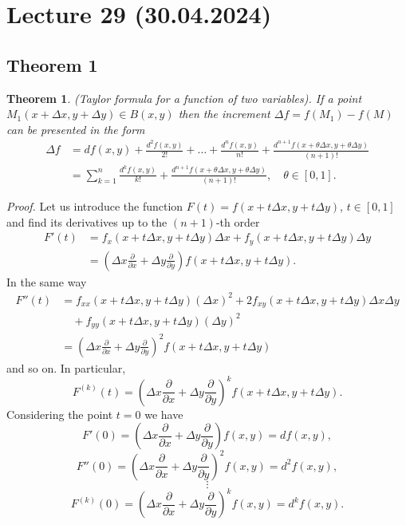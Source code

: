 \documentclass{article}
\newtheorem{theorem}{Theorem}
\begin{document}
\section*{Lecture 29 (30.04.2024)}

\subsection*{Theorem 1}

\begin{theorem}
(Taylor formula for a function of two variables). If a point $M_1(x + \Delta x, y + \Delta y) \in B(x, y)$ then the increment $\Delta f = f(M_1) - f(M)$ can be presented in the form
\begin{align*}
\Delta f &= df(x, y) + \frac{d^2f(x, y)}{2!} + \dots + \frac{d^n f(x, y)}{n!} + \frac{d^{n+1}f(x + \theta \Delta x, y + \theta \Delta y)}{(n+1)!} \\
         &= \sum_{k=1}^{n} \frac{d^k f(x, y)}{k!} + \frac{d^{n+1}f(x + \theta \Delta x, y + \theta \Delta y)}{(n+1)!}, \quad \theta \in [0, 1].
\end{align*}
\end{theorem}

\vspace{1em}

\textit{Proof.} Let us introduce the function $F(t) = f(x + t\Delta x, y + t\Delta y)$, $t \in [0, 1]$ and find its derivatives up to the $(n+1)$-th order
\begin{align*}
F'(t) &= f_x(x + t\Delta x, y + t\Delta y)\Delta x + f_y(x + t\Delta x, y + t\Delta y)\Delta y \\
      &= \left(\Delta x \frac{\partial}{\partial x} + \Delta y \frac{\partial}{\partial y}\right) f(x + t\Delta x, y + t\Delta y).
\end{align*}
In the same way
\begin{align*}
F''(t) &= f_{xx}(x + t\Delta x, y + t\Delta y)(\Delta x)^2 + 2f_{xy}(x + t\Delta x, y + t\Delta y)\Delta x\Delta y \\
       &\quad + f_{yy}(x + t\Delta x, y + t\Delta y)(\Delta y)^2 \\
       &= \left(\Delta x \frac{\partial}{\partial x} + \Delta y \frac{\partial}{\partial y}\right)^2 f(x + t\Delta x, y + t\Delta y)
\end{align*}
and so on. In particular,
\[
F^{(k)}(t) = \left(\Delta x \frac{\partial}{\partial x} + \Delta y \frac{\partial}{\partial y}\right)^k f(x + t\Delta x, y + t\Delta y).
\]
Considering the point $t = 0$ we have
\[
F'(0) = \left(\Delta x \frac{\partial}{\partial x} + \Delta y \frac{\partial}{\partial y}\right) f(x, y) = df(x, y),
\]
\[
F''(0) = \left(\Delta x \frac{\partial}{\partial x} + \Delta y \frac{\partial}{\partial y}\right)^2 f(x, y) = d^2f(x, y),
\]
\[
\vdots
\]
\[
F^{(k)}(0) = \left(\Delta x \frac{\partial}{\partial x} + \Delta y \frac{\partial}{\partial y}\right)^k f(x, y) = d^k f(x, y).
\]
\end{document}
